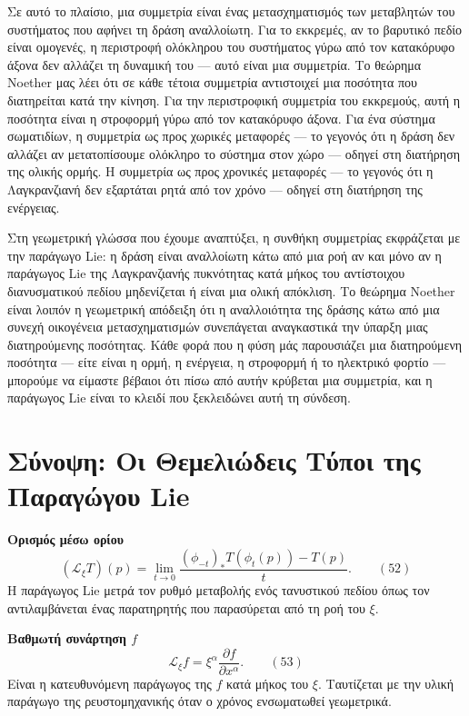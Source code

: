 \documentclass[12pt]{article}
\begin{document}
Σε αυτό το πλαίσιο, μια συμμετρία είναι ένας μετασχηματισμός των μεταβλητών του συστήματος που αφήνει τη δράση αναλλοίωτη. Για το εκκρεμές, αν το βαρυτικό πεδίο είναι ομογενές, η περιστροφή ολόκληρου του συστήματος γύρω από τον κατακόρυφο άξονα δεν αλλάζει τη δυναμική του --- αυτό είναι μια συμμετρία. Το θεώρημα Noether μας λέει ότι σε κάθε τέτοια συμμετρία αντιστοιχεί μια ποσότητα που διατηρείται κατά την κίνηση. Για την περιστροφική συμμετρία του εκκρεμούς, αυτή η ποσότητα είναι η στροφορμή γύρω από τον κατακόρυφο άξονα. Για ένα σύστημα σωματιδίων, η συμμετρία ως προς χωρικές μεταφορές --- το γεγονός ότι η δράση δεν αλλάζει αν μετατοπίσουμε ολόκληρο το σύστημα στον χώρο --- οδηγεί στη διατήρηση της ολικής ορμής. Η συμμετρία ως προς χρονικές μεταφορές --- το γεγονός ότι η Λαγκρανζιανή δεν εξαρτάται ρητά από τον χρόνο --- οδηγεί στη διατήρηση της ενέργειας.

Στη γεωμετρική γλώσσα που έχουμε αναπτύξει, η συνθήκη συμμετρίας εκφράζεται με την παράγωγο Lie: η δράση είναι αναλλοίωτη κάτω από μια ροή αν και μόνο αν η παράγωγος Lie της Λαγκρανζιανής πυκνότητας κατά μήκος του αντίστοιχου διανυσματικού πεδίου μηδενίζεται ή είναι μια ολική απόκλιση. Το θεώρημα Noether είναι λοιπόν η γεωμετρική απόδειξη ότι η αναλλοιότητα της δράσης κάτω από μια συνεχή οικογένεια μετασχηματισμών συνεπάγεται αναγκαστικά την ύπαρξη μιας διατηρούμενης ποσότητας. Κάθε φορά που η φύση μάς παρουσιάζει μια διατηρούμενη ποσότητα --- είτε είναι η ορμή, η ενέργεια, η στροφορμή ή το ηλεκτρικό φορτίο --- μπορούμε να είμαστε βέβαιοι ότι πίσω από αυτήν κρύβεται μια συμμετρία, και η παράγωγος Lie είναι το κλειδί που ξεκλειδώνει αυτή τη σύνδεση.

\section{Σύνοψη: Οι Θεμελιώδεις Τύποι της Παραγώγου Lie}

\textbf{Ορισμός μέσω ορίου}
\begin{equation}
(\mathcal{L}_\xi T)(p) = \lim_{t \to 0} \frac{(\phi_{-t})_* T(\phi_t(p)) - T(p)}{t}. \qquad (52)
\end{equation}
Η παράγωγος Lie μετρά τον ρυθμό μεταβολής ενός τανυστικού πεδίου όπως τον αντιλαμβάνεται ένας παρατηρητής που παρασύρεται από τη ροή του $\xi$.

\textbf{Βαθμωτή συνάρτηση $f$}
\begin{equation}
\mathcal{L}_\xi f = \xi^\alpha \frac{\partial f}{\partial x^\alpha}. \qquad (53)
\end{equation}
Είναι η κατευθυνόμενη παράγωγος της $f$ κατά μήκος του $\xi$. Ταυτίζεται με την υλική παράγωγο της ρευστομηχανικής όταν ο χρόνος ενσωματωθεί γεωμετρικά.
\end{document}
